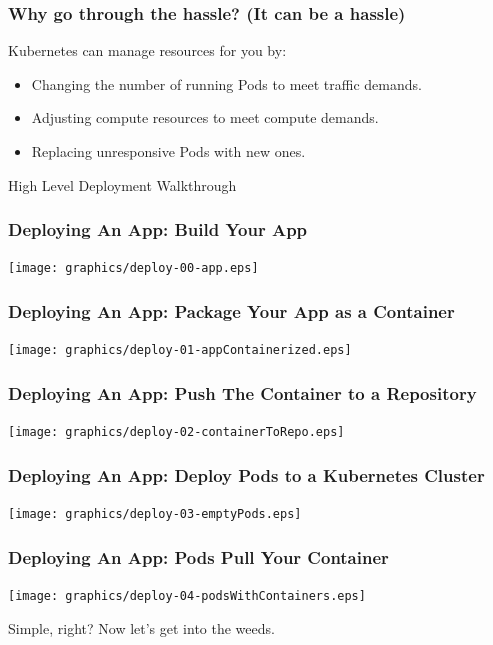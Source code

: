\documentclass{beamer}
\begin{document}
\begin{frame}
    \frametitle{Why go through the hassle? (It can be a hassle)}
    Kubernetes can manage resources for you by:
    \begin{itemize}
        \item{Changing the number of running Pods to meet traffic demands.}
        \item{Adjusting compute resources to meet compute demands.}
        \item{Replacing unresponsive Pods with new ones.}
    \end{itemize}
\end{frame}

\begin{frame}
    \begin{center}
        \Huge High Level Deployment Walkthrough
    \end{center}
\end{frame}

\begin{frame}
    \frametitle{Deploying An App: Build Your App}
    \texttt{[image: graphics/deploy-00-app.eps]}
\end{frame}

\begin{frame}
    \frametitle{Deploying An App: Package Your App as a Container}
    \texttt{[image: graphics/deploy-01-appContainerized.eps]}
\end{frame}

\begin{frame}
    \frametitle{Deploying An App: Push The Container to a Repository}
    \texttt{[image: graphics/deploy-02-containerToRepo.eps]}
\end{frame}

\begin{frame}
    \frametitle{Deploying An App: Deploy Pods to a Kubernetes Cluster}
    \texttt{[image: graphics/deploy-03-emptyPods.eps]}
\end{frame}

\begin{frame}
    \frametitle{Deploying An App: Pods Pull Your Container}
    \texttt{[image: graphics/deploy-04-podsWithContainers.eps]}
\end{frame}

\begin{frame}
    \begin{center}
        \Huge Simple, right? Now let's get into the weeds.
    \end{center}
\end{frame}
\end{document}

